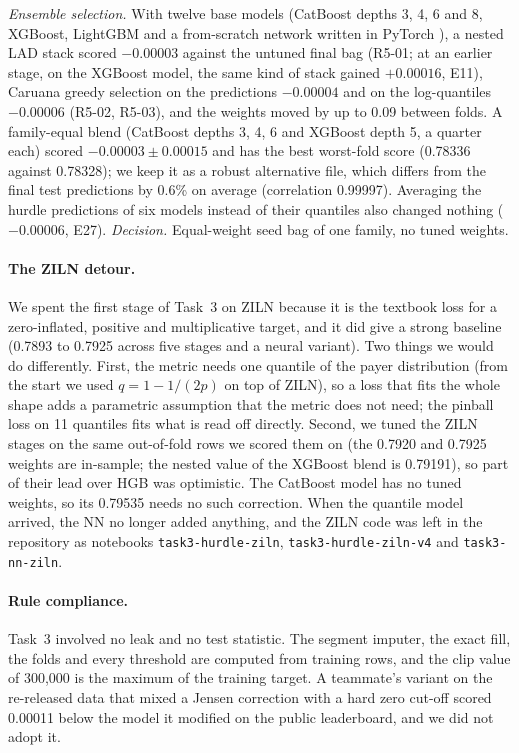 \documentclass[../main.tex]{subfiles}
\begin{document}
\emph{Ensemble selection.} With twelve base models (CatBoost depths 3, 4, 6 and 8, XGBoost, LightGBM and a from-scratch network written in PyTorch \citep{pytorch}), a nested LAD stack scored $-0.00003$ against the untuned final bag (R5-01; at an earlier stage, on the XGBoost model, the same kind of stack gained $+0.00016$, E11), Caruana greedy selection \citep{caruana} on the predictions $-0.00004$ and on the log-quantiles $-0.00006$ (R5-02, R5-03), and the weights moved by up to 0.09 between folds. A family-equal blend (CatBoost depths 3, 4, 6 and XGBoost depth 5, a quarter each) scored $-0.00003\pm0.00015$ and has the best worst-fold score (0.78336 against 0.78328); we keep it as a robust alternative file, which differs from the final test predictions by 0.6\% on average (correlation 0.99997). Averaging the hurdle predictions of six models instead of their quantiles also changed nothing ($-0.00006$, E27). \emph{Decision.} Equal-weight seed bag of one family, no tuned weights.

\paragraph{The ZILN detour.} We spent the first stage of Task~3 on ZILN because it is the textbook loss for a zero-inflated, positive and multiplicative target, and it did give a strong baseline (0.7893 to 0.7925 across five stages and a neural variant). Two things we would do differently. First, the metric needs one quantile of the payer distribution (from the start we used $q=1-1/(2p)$ on top of ZILN), so a loss that fits the whole shape adds a parametric assumption that the metric does not need; the pinball loss on 11 quantiles fits what is read off directly. Second, we tuned the ZILN stages on the same out-of-fold rows we scored them on (the 0.7920 and 0.7925 weights are in-sample; the nested value of the XGBoost blend is 0.79191), so part of their lead over HGB was optimistic. The CatBoost model has no tuned weights, so its 0.79535 needs no such correction. When the quantile model arrived, the NN no longer added anything, and the ZILN code was left in the repository as notebooks \texttt{task3-hurdle-ziln}, \texttt{task3-hurdle-ziln-v4} and \texttt{task3-nn-ziln}.

\paragraph{Rule compliance.} Task~3 involved no leak and no test statistic. The segment imputer, the exact fill, the folds and every threshold are computed from training rows, and the clip value of 300{,}000 is the maximum of the training target. A teammate's variant on the re-released data that mixed a Jensen correction with a hard zero cut-off scored 0.00011 below the model it modified on the public leaderboard, and we did not adopt it.
\end{document}
